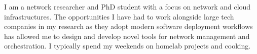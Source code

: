 \documentclass[9pt]{developercv} %
\begin{document}
\begin{minipage}[t]{0.35\textwidth} %
	\vspace{-\baselineskip} %

	I am a network researcher and PhD student with a focus on network and cloud
	infrastructures. The opportunities I have had to work alongside large tech
	companies in my research as they adopt modern software deployment workflows
	has allowed me to design and develop novel tools for network management and
	orchestration. I typically spend my weekends on homelab projects and
	cooking.\\
\end{minipage}
\hfill %
\begin{minipage}[t]{0.31\textwidth} %
	\vspace{-\baselineskip} %
	\begin{barchart}{4.1}
	\end{barchart}
\end{minipage}
\hfill %
\begin{minipage}[t]{0.29\textwidth} %
	\vspace{-\baselineskip}\vspace{-\baselineskip} %
	\\
	\mbox{}
	\mbox{}
	\mbox{}
	\mbox{}
	\mbox{}
\end{minipage}


\vspace{-1em}
\end{document}
